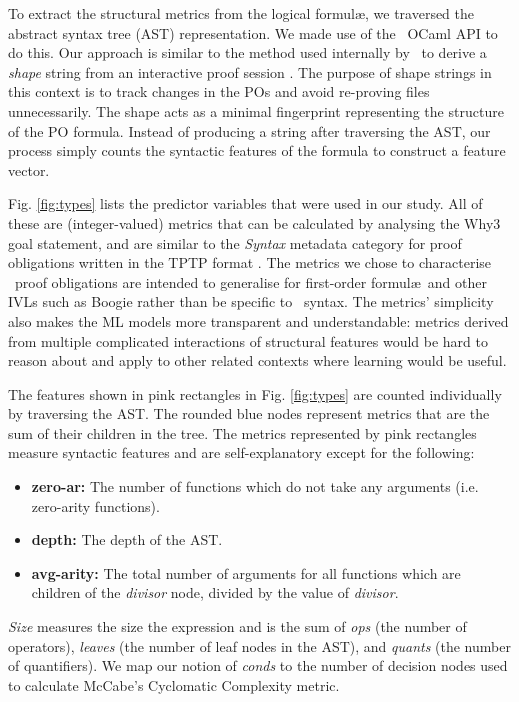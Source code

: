 To extract the structural metrics from the logical formul\ae, we traversed the abstract syntax tree (AST) representation. 
We made use of the \why~OCaml API to do this. 
Our approach is similar to the method used internally by \why~to derive a \textit{shape} string from an interactive proof session \cite{why:preserving}. 
The purpose of shape strings in this context is to track changes in the POs and avoid re-proving files unnecessarily. 
The shape acts as a minimal fingerprint representing the structure of the PO formula. 
Instead of producing a string after traversing the AST, our process simply counts the syntactic features of the formula to construct a feature vector.

Fig. \ref{fig:types} lists the predictor variables that were used in our study.  
All of these are (integer-valued) metrics that can be calculated by analysing the \textsf{Why3} goal statement, and are similar to the \textit{Syntax} metadata category for proof obligations written in the TPTP format \cite{TPTP}. 
The metrics we chose to characterise \why~proof obligations are intended to generalise for first-order formul\ae~and other IVLs such as Boogie \cite{Boogie} rather than be specific to \why~syntax.
The metrics' simplicity also makes the ML models more transparent and understandable: metrics derived from multiple complicated interactions of structural features would be hard to reason about and apply to other related contexts where learning would be useful. 

The features shown in pink rectangles in Fig. \ref{fig:types} are counted individually by traversing the AST. 
The rounded blue nodes represent metrics that are the sum of their children in the tree. 
The metrics represented by pink rectangles measure syntactic features and are self-explanatory except for the following:
\begin{itemize}[leftmargin=*]
	\item[] \textbf{zero-ar:} The number of functions which do not take any arguments (i.e. zero-arity functions).
	\item[] \textbf{depth:} The depth of the AST.
	\item[] \textbf{avg-arity:} The total number of arguments for all functions which are children of the \textit{divisor} node, divided by the value of \textit{divisor}.
\end{itemize}   

\textit{Size} measures the size the expression and is the sum of \textit{ops} (the number of operators), \textit{leaves} (the number of leaf nodes in the AST), and \textit{quants} (the number of quantifiers). 
We map our notion of \textit{conds} to the number of decision nodes used to calculate McCabe's Cyclomatic Complexity metric.
  

